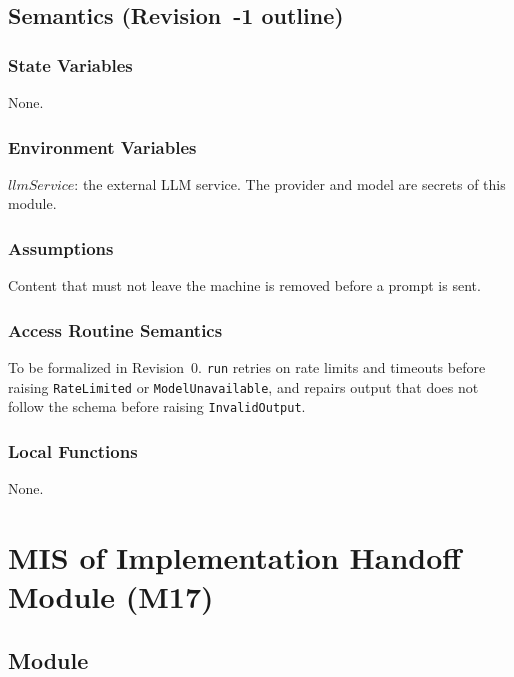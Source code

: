 \documentclass[12pt, titlepage]{article}
\begin{document}
\subsection{Semantics (Revision~-1 outline)}

\subsubsection{State Variables}

None.

\subsubsection{Environment Variables}

$llmService$: the external LLM service. The provider and model are secrets
of this module.

\subsubsection{Assumptions}

Content that must not leave the machine is removed before a prompt is sent.

\subsubsection{Access Routine Semantics}

To be formalized in Revision~0. \texttt{run} retries on rate limits and
timeouts before raising \texttt{RateLimited} or \texttt{ModelUnavailable}, and
repairs output that does not follow the schema before raising
\texttt{InvalidOutput}.

\subsubsection{Local Functions}

None.

\newpage
\section{MIS of Implementation Handoff Module (M17)} \label{MISHandoff}

\subsection{Module}
\end{document}
